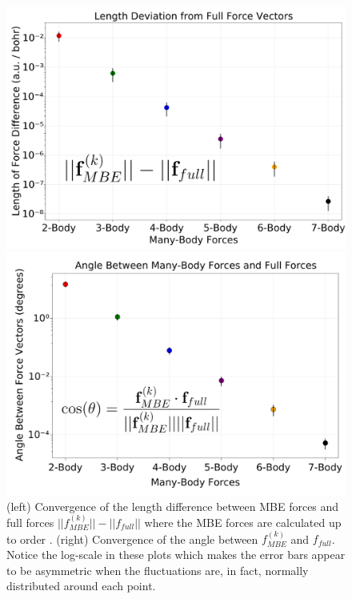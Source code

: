 \documentclass[11pt, proquest]{uwthesis}[2020/02/24]
\begin{document}
\begin{figure}[t]
\uwsinglespace
\begin{center}
\begin{minipage}{0.45\textwidth}
\includegraphics[width=\textwidth]{Figures/Chapter_4/ch4_figure_6_top.png}
\end{minipage}
\begin{minipage}{0.45\textwidth}
\includegraphics[width=\textwidth]{Figures/Chapter_4/ch4_figure_6_bottom.png}
\end{minipage}
\end{center}
\caption[(Convergence of the length difference between MBE forces and full forces $||f^{(k)}_{MBE}||-||f_{full}||$ where the MBE forces are calculated up to order . (6b, right) Convergence of the angle between $f^{(k)}_{MBE}$ and $f_{full}$.]{(left) Convergence of the length difference between MBE forces and full forces $||f^{(k)}_{MBE}||-||f_{full}||$ where the MBE forces are calculated up to order . (right) Convergence of the angle between $f^{(k)}_{MBE}$ and $f_{full}$. Notice the log-scale in these plots which makes the error bars appear to be asymmetric when the fluctuations are, in fact, normally distributed around each point.}
\label{fig:MBE_MD_F6}
\end{figure}
\end{document}
